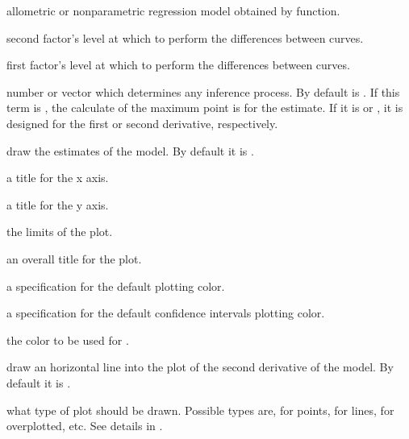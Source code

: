 \begin{Arguments}
\begin{ldescription}
\item[\code{model}] allometric or nonparametric regression model obtained by  function.

\item[\code{factor2}] 
second factor's level at which to perform the differences between curves.

\item[\code{factor1}] first factor's level at which to perform the differences between curves.

\item[\code{der}] 
number or vector which determines any inference process. By default  is . If this term is , the calculate of the maximum point is for the estimate. If it is  or , it is designed for the first or second derivative, respectively.

\item[\code{est.include}]  draw the estimates of the model. By default it is .

\item[\code{xlab}] a title for the x axis. 

\item[\code{ylab}] 
a title for the y axis.

\item[\code{ylim}] the  limits of the plot.

\item[\code{main}]  an overall title for the plot.

\item[\code{col}] 
a specification for the default plotting color.

\item[\code{CIcol}] 
a specification for the default confidence intervals plotting color.

\item[\code{ablinecol}] the color to be used for .

\item[\code{abline}]  draw an horizontal line into the plot of the second derivative of the model. By default it is .

\item[\code{type}] 
what type of plot should be drawn. Possible types are,  for points,  for lines,  for overplotted, etc. See details in .


\end{ldescription}
\end{Arguments}

